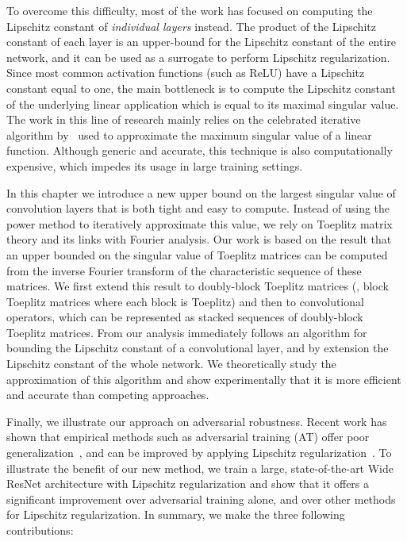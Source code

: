 To overcome this difficulty, most of the work has focused on computing the Lipschitz constant of \emph{individual layers} instead.
The product of the Lipschitz constant of each layer is an upper-bound for the Lipschitz constant of the entire network, and it can be used as a surrogate to perform Lipschitz regularization.
Since most common activation functions (such as ReLU) have a Lipschitz constant equal to one, the main bottleneck is to compute the Lipschitz constant of the underlying linear application which is equal to its maximal singular value.
The work in this line of research mainly relies on the celebrated iterative algorithm by~\citet{golub2000eigenvalue} used to approximate the maximum singular value of a linear function.
Although generic and accurate, this technique is also computationally expensive, which impedes its usage in large training settings.

In this chapter we introduce a new upper bound on the largest singular value of convolution layers that is both tight and easy to compute.
Instead of using the power method to iteratively approximate this value, we rely on Toeplitz matrix theory and its links with Fourier analysis.
Our work is based on the result \cite{gray2006toeplitz} that an upper bounded on the singular value of  Toeplitz matrices can be computed from 
the inverse Fourier transform of the characteristic sequence of these matrices.
We first extend this result to doubly-block Toeplitz matrices (\ie, block Toeplitz matrices where each block is Toeplitz) and then to convolutional operators, which can be represented as stacked sequences of doubly-block Toeplitz matrices. 
From our analysis immediately follows an algorithm for bounding the Lipschitz constant of a convolutional layer, and by extension the Lipschitz constant of the whole network. We theoretically study the approximation of this algorithm and show experimentally that it is more efficient and accurate than competing approaches.

Finally, we illustrate our approach on adversarial robustness. 
Recent work has shown that empirical methods such as adversarial training (AT) offer poor generalization~\cite{schmidt2018adversarially}, and can be improved by applying Lipschitz regularization~\cite{farnia2018generalizable}.
To illustrate the benefit of our new method, we train a large, state-of-the-art Wide ResNet architecture with Lipschitz regularization and show that it offers a significant improvement over adversarial training alone, and over other methods for Lipschitz regularization. 
In summary, we make the three following contributions:

